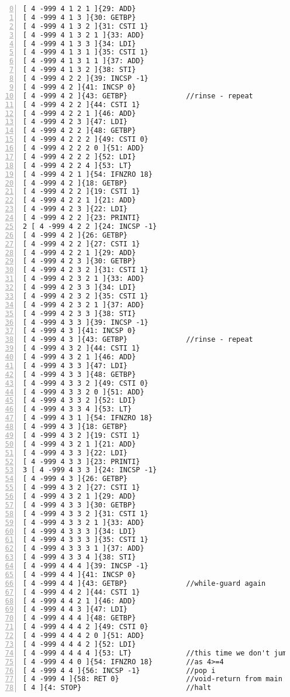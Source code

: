 \documentclass[a4paper, titlepage]{article}
\begin{document}
\begin{lstlisting}[numbers=left, firstnumber=0]
[ 4 -999 4 1 2 1 ]{29: ADD}
[ 4 -999 4 1 3 ]{30: GETBP}
[ 4 -999 4 1 3 2 ]{31: CSTI 1}
[ 4 -999 4 1 3 2 1 ]{33: ADD}
[ 4 -999 4 1 3 3 ]{34: LDI}
[ 4 -999 4 1 3 1 ]{35: CSTI 1}
[ 4 -999 4 1 3 1 1 ]{37: ADD}
[ 4 -999 4 1 3 2 ]{38: STI}
[ 4 -999 4 2 2 ]{39: INCSP -1}
[ 4 -999 4 2 ]{41: INCSP 0}
[ 4 -999 4 2 ]{43: GETBP}              //rinse - repeat
[ 4 -999 4 2 2 ]{44: CSTI 1}
[ 4 -999 4 2 2 1 ]{46: ADD}
[ 4 -999 4 2 3 ]{47: LDI}
[ 4 -999 4 2 2 ]{48: GETBP}
[ 4 -999 4 2 2 2 ]{49: CSTI 0}
[ 4 -999 4 2 2 2 0 ]{51: ADD}
[ 4 -999 4 2 2 2 ]{52: LDI}
[ 4 -999 4 2 2 4 ]{53: LT}
[ 4 -999 4 2 1 ]{54: IFNZRO 18}
[ 4 -999 4 2 ]{18: GETBP}
[ 4 -999 4 2 2 ]{19: CSTI 1}
[ 4 -999 4 2 2 1 ]{21: ADD}
[ 4 -999 4 2 3 ]{22: LDI}
[ 4 -999 4 2 2 ]{23: PRINTI}
2 [ 4 -999 4 2 2 ]{24: INCSP -1}
[ 4 -999 4 2 ]{26: GETBP}
[ 4 -999 4 2 2 ]{27: CSTI 1}
[ 4 -999 4 2 2 1 ]{29: ADD}
[ 4 -999 4 2 3 ]{30: GETBP}
[ 4 -999 4 2 3 2 ]{31: CSTI 1}
[ 4 -999 4 2 3 2 1 ]{33: ADD}
[ 4 -999 4 2 3 3 ]{34: LDI}
[ 4 -999 4 2 3 2 ]{35: CSTI 1}
[ 4 -999 4 2 3 2 1 ]{37: ADD}
[ 4 -999 4 2 3 3 ]{38: STI}
[ 4 -999 4 3 3 ]{39: INCSP -1}
[ 4 -999 4 3 ]{41: INCSP 0}
[ 4 -999 4 3 ]{43: GETBP}              //rinse - repeat
[ 4 -999 4 3 2 ]{44: CSTI 1}
[ 4 -999 4 3 2 1 ]{46: ADD}
[ 4 -999 4 3 3 ]{47: LDI}
[ 4 -999 4 3 3 ]{48: GETBP}
[ 4 -999 4 3 3 2 ]{49: CSTI 0}
[ 4 -999 4 3 3 2 0 ]{51: ADD}
[ 4 -999 4 3 3 2 ]{52: LDI}
[ 4 -999 4 3 3 4 ]{53: LT}
[ 4 -999 4 3 1 ]{54: IFNZRO 18}
[ 4 -999 4 3 ]{18: GETBP}
[ 4 -999 4 3 2 ]{19: CSTI 1}
[ 4 -999 4 3 2 1 ]{21: ADD}
[ 4 -999 4 3 3 ]{22: LDI}
[ 4 -999 4 3 3 ]{23: PRINTI}
3 [ 4 -999 4 3 3 ]{24: INCSP -1}
[ 4 -999 4 3 ]{26: GETBP}
[ 4 -999 4 3 2 ]{27: CSTI 1}
[ 4 -999 4 3 2 1 ]{29: ADD}
[ 4 -999 4 3 3 ]{30: GETBP}
[ 4 -999 4 3 3 2 ]{31: CSTI 1}
[ 4 -999 4 3 3 2 1 ]{33: ADD}
[ 4 -999 4 3 3 3 ]{34: LDI}
[ 4 -999 4 3 3 3 ]{35: CSTI 1}
[ 4 -999 4 3 3 3 1 ]{37: ADD}
[ 4 -999 4 3 3 4 ]{38: STI}
[ 4 -999 4 4 4 ]{39: INCSP -1}
[ 4 -999 4 4 ]{41: INCSP 0}
[ 4 -999 4 4 ]{43: GETBP}              //while-guard again
[ 4 -999 4 4 2 ]{44: CSTI 1}
[ 4 -999 4 4 2 1 ]{46: ADD}
[ 4 -999 4 4 3 ]{47: LDI}
[ 4 -999 4 4 4 ]{48: GETBP}
[ 4 -999 4 4 4 2 ]{49: CSTI 0}
[ 4 -999 4 4 4 2 0 ]{51: ADD}
[ 4 -999 4 4 4 2 ]{52: LDI}
[ 4 -999 4 4 4 4 ]{53: LT}             //this time we don't jump though
[ 4 -999 4 4 0 ]{54: IFNZRO 18}        //as 4>=4
[ 4 -999 4 4 ]{56: INCSP -1}           //pop i
[ 4 -999 4 ]{58: RET 0}                //void-return from main
[ 4 ]{4: STOP}                         //halt
\end{lstlisting}
\end{document}
